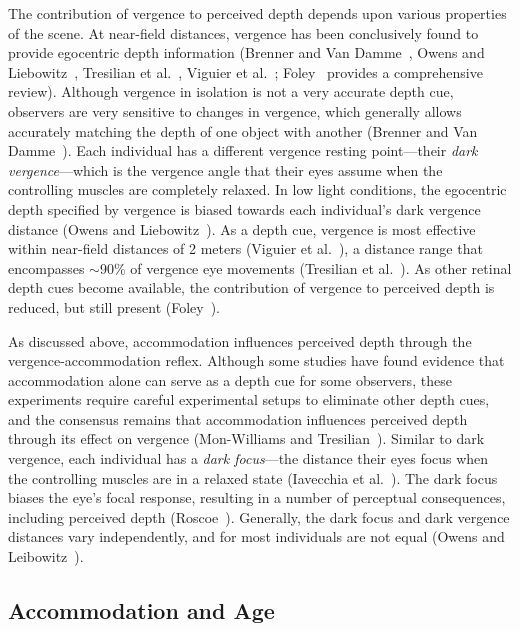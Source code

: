 \documentclass[10pt,journal,compsoc]{IEEEtran}
\makeatletter
\newcommand{\etal}{et al.\@\xspace} %
\makeatother
\begin{document}
The contribution of vergence to perceived depth depends upon various properties of the scene.  At near-field distances, vergence has been conclusively found to provide egocentric depth information (Brenner and Van Damme~\cite{brenner:1998}, Owens and Liebowitz~\cite{owens:1980}, Tresilian \etal~\cite{tresilian:1999}, Viguier \etal~\cite{viguier:2001}; Foley~\cite{foley:1980} provides a comprehensive review).  Although vergence in isolation is not a very accurate depth cue, observers are very sensitive to changes in vergence, which generally allows accurately matching the depth of one object with another (Brenner and Van Damme~\cite{brenner:1998}).  Each individual has a different vergence resting point---their \emph{dark vergence}---which is the vergence angle that their eyes assume when the controlling muscles are completely relaxed.  In low light conditions, the egocentric depth specified by vergence is biased towards each individual's dark vergence distance (Owens and Liebowitz~\cite{owens:1980}).  As a depth cue, vergence is most effective within near-field distances of 2 meters (Viguier \etal~\cite{viguier:2001}), a distance range that encompasses $\sim$90\% of vergence eye movements (Tresilian \etal~\cite{tresilian:1999}).  As other retinal depth cues become available, the contribution of vergence to perceived depth is reduced, but still present (Foley~\cite{foley:1980}).

As discussed above, accommodation influences perceived depth through the vergence-ac\-commodation reflex.  Although some studies have found evidence that accommodation alone can serve as a depth cue for some observers, these experiments require careful experimental setups to eliminate other depth cues, and the consensus remains that accommodation influences perceived depth through its effect on vergence (Mon-Williams and Tresilian~\cite{monwilliams:2000}).  Similar to dark vergence, each individual has a \emph{dark focus}---the distance their eyes focus when the controlling muscles are in a relaxed state (Iavecchia \etal~\cite{iavecchia:1988}).  The dark focus biases the eye's focal response, resulting in a number of perceptual consequences, including perceived depth (Roscoe~\cite{roscoe:1985}).  Generally, the dark focus and dark vergence distances vary independently, and for most individuals are not equal (Owens and Leibowitz~\cite{owens:1980}).

\subsection{Accommodation and Age}
\label{s:age}
\end{document}

